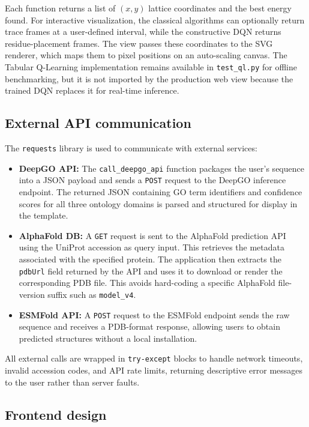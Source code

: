 Each function returns a list of $(x, y)$ lattice coordinates and the best energy found. For interactive visualization, the classical algorithms can optionally return trace frames at a user-defined interval, while the constructive DQN returns residue-placement frames. The view passes these coordinates to the SVG renderer, which maps them to pixel positions on an auto-scaling canvas. The Tabular Q-Learning implementation remains available in \texttt{test\_ql.py} for offline benchmarking, but it is not imported by the production web view because the trained DQN replaces it for real-time inference.

\subsection{External API communication}
\label{cap3:subsec_api}

The \texttt{requests} library is used to communicate with external services:

\begin{itemize}
    \item \textbf{DeepGO API:} The \texttt{call\_deepgo\_api} function packages the user's sequence into a JSON payload and sends a \texttt{POST} request to the DeepGO inference endpoint. The returned JSON containing GO term identifiers and confidence scores for all three ontology domains is parsed and structured for display in the template.
    \item \textbf{AlphaFold DB:} A \texttt{GET} request is sent to the AlphaFold prediction API using the UniProt accession as query input. This retrieves the metadata associated with the specified protein. The application then extracts the \texttt{pdbUrl} field returned by the API and uses it to download or render the corresponding PDB file. This avoids hard-coding a specific AlphaFold file-version suffix such as \texttt{model\_v4}.
    \item \textbf{ESMFold API:} A \texttt{POST} request to the ESMFold endpoint sends the raw sequence and receives a PDB-format response, allowing users to obtain predicted structures without a local installation.
\end{itemize}

All external calls are wrapped in \texttt{try-except} blocks to handle network timeouts, invalid accession codes, and API rate limits, returning descriptive error messages to the user rather than server faults.

\subsection{Frontend design}
\label{cap3:subsec_frontend}

